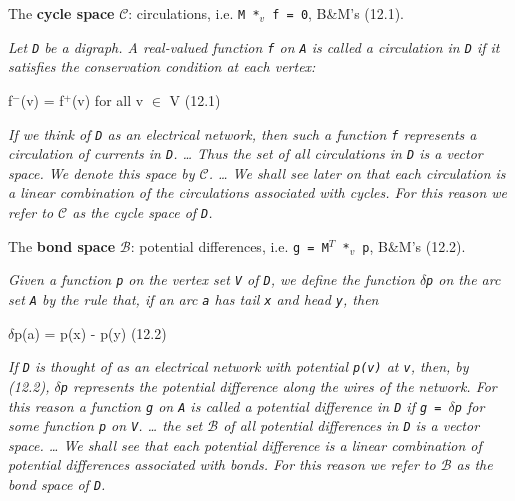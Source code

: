 \begin{definition}
\label{CycleSpace.cycleSpace}
\leanok
{}
The \textbf{cycle space} \texttt{$\mathcal{C}$}: circulations, i.e. \texttt{M *$_{v}$ f
= 0}, B\&M's (12.1).

\emph{Let \texttt{D} be a digraph.  A real-valued
function \texttt{f} on \texttt{A} is called a circulation in \texttt{D} if it satisfies
the conservation
condition at each vertex:}

f$^{-}$(v) = f$^{+}$(v)   for all v $\in$ V                                    (12.1)

\emph{If we think of \texttt{D} as an electrical network, then such a function
\texttt{f} represents a
circulation of currents in \texttt{D}. \dots{} Thus the set of all circulations in
\texttt{D} is a
vector space. We denote this space by \texttt{$\mathcal{C}$}. \dots{} We shall see later
on that each
circulation is a linear combination of the circulations associated with cycles.  For
this reason we refer to \texttt{$\mathcal{C}$} as the cycle space of \texttt{D}.}
\end{definition}

\begin{definition}
\label{CycleSpace.bondSpace}
\leanok
{}
The \textbf{bond space} \texttt{$\mathcal{B}$}: potential differences, i.e. \texttt{g =
M$^{T}$ *$_{v}$ p}, B\&M's (12.2).

\emph{Given a function \texttt{p} on the vertex set
\texttt{V} of \texttt{D}, we define the function \texttt{$\delta$p} on the arc set \texttt{A} by the rule that, if an
arc \texttt{a} has tail \texttt{x} and head \texttt{y}, then}

$\delta$p(a) = p(x) - p(y)                                              (12.2)

\emph{If \texttt{D} is thought of as an electrical network with potential \texttt{p(v)}
at \texttt{v}, then,
by (12.2), \texttt{$\delta$p} represents the potential difference along the wires of the
network.
For this reason a function \texttt{g} on \texttt{A} is called a potential difference in
\texttt{D} if
\texttt{g = $\delta$p} for some function \texttt{p} on \texttt{V}.  \dots{}  the set \texttt{$\mathcal{B}$} of all potential differences
in \texttt{D} is a vector space. \dots{} We shall see that each potential difference is
a
linear combination of potential differences associated with bonds.  For this reason
we refer to \texttt{$\mathcal{B}$} as the bond space of \texttt{D}.}
\end{definition}

